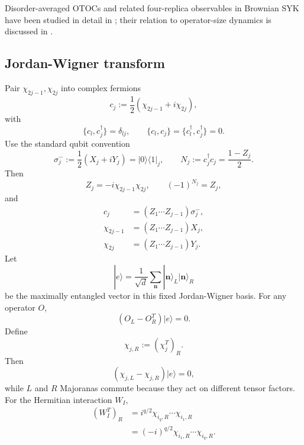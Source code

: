 \documentclass{article}
\theoremstyle{definition}
\begin{document}
Disorder-averaged OTOCs and related four-replica observables in Brownian
SYK have been studied in detail in
\cite{SunderhaufEtAl2019,AgarwalXu2022}; their relation to operator-size
dynamics is discussed in \cite{ZhangGu2023,Xu2025}.


\subsection{Jordan-Wigner transform}

Pair $\chi_{2j-1},\chi_{2j}$ into complex fermions
\begin{equation}
    c_j:=\frac12(\chi_{2j-1}+i\chi_{2j}),
\end{equation}
with
\begin{equation}
    \{c_l,c_j^\dagger\}=\delta_{lj},
    \qquad
    \{c_l,c_j\}=\{c_l^\dagger,c_j^\dagger\}=0.
\end{equation}
Use the standard qubit convention
\begin{equation}
    \sigma_j^-:=\frac12(X_j+iY_j)=|0\rangle\langle1|_j,
    \qquad
    N_j:=c_j^\dagger c_j=\frac{1-Z_j}{2}.
\end{equation}
Then
\begin{equation}
    Z_j=-i\chi_{2j-1}\chi_{2j},
    \qquad
    (-1)^{N_j}=Z_j,
\end{equation}
and
\begin{align}
    c_j&=(Z_1\cdots Z_{j-1})\sigma_j^-,
    \nonumber\\
    \chi_{2j-1}&=(Z_1\cdots Z_{j-1})X_j,
    \nonumber\\
    \chi_{2j}&=(Z_1\cdots Z_{j-1})Y_j.
\end{align}
Let
\begin{equation}
    |e\rangle
    =\frac1{\sqrt d}\sum_{\mathbf n}
    |\mathbf n\rangle_L|\mathbf n\rangle_R
\end{equation}
be the maximally entangled vector in this fixed Jordan-Wigner basis.  For
any operator $O$,
\begin{equation}
    (O_L-O_R^T)|e\rangle=0.
\end{equation}
Define
\begin{equation}
    \chi_{j,R}:=(\chi_j^T)_R.
\end{equation}
Then
\begin{equation}
    (\chi_{j,L}-\chi_{j,R})|e\rangle=0,
\end{equation}
while $L$ and $R$ Majoranas commute because they act on different tensor
factors.  For the Hermitian interaction $W_I$,
\begin{align}
    (W_I^T)_R
    &=i^{q/2}\chi_{i_q,R}\cdots\chi_{i_1,R}
    \nonumber\\
    &=(-i)^{q/2}\chi_{i_1,R}\cdots\chi_{i_q,R}.
\end{align}
\end{document}
